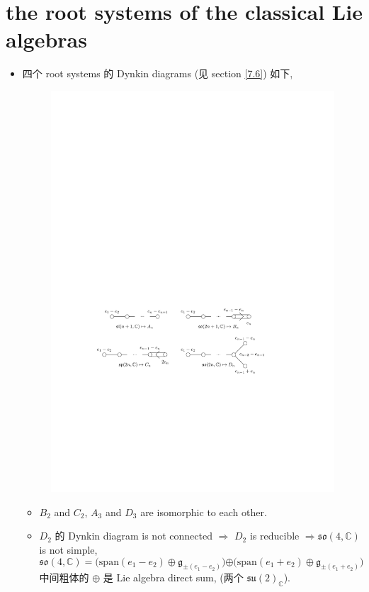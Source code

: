 \section{the root systems of the classical Lie algebras} \label{6.7}
\begin{itemize}
	\item 四个 root systems 的 Dynkin diagrams (见 section \ref{7.6}) 如下,
	
	\begin{figure}[H]
		\centering
		\includegraphics[scale=1]{figures/classical Dynkin diagrams.pdf}
	\end{figure}
	
	\begin{itemize}
		\item $B_2$ and $C_2$, $A_3$ and $D_3$ are isomorphic to each other.
		
		\item $D_2$ 的 Dynkin diagram is not connected $\Longrightarrow$ $D_2$ is reducible $\Longrightarrow \mathfrak{so}(4, \mathbb{C})$ is not simple,
		\begin{equation}
			\mathfrak{so}(4, \mathbb{C}) = \Big( \mathrm{span}(e_1 - e_2) \oplus \mathfrak{g}_{\pm (e_1 - e_2)} \Big) \boldsymbol{\oplus} \Big( \mathrm{span}(e_1 + e_2) \oplus \mathfrak{g}_{\pm (e_1 + e_2)} \Big)
		\end{equation}
		中间粗体的 $\oplus$ 是 Lie algebra direct sum, (两个 $\mathfrak{su}(2)_\mathbb{C}$).
		

\end{itemize}
\end{itemize}
